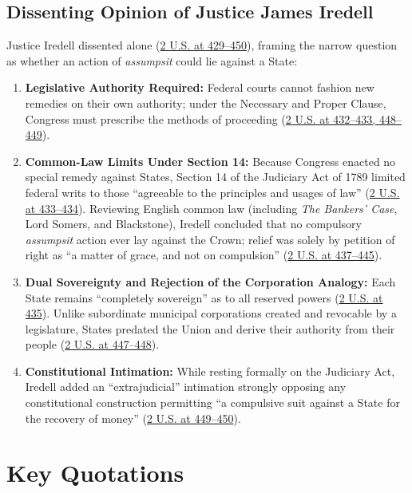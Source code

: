 \documentclass[12pt]{article}
\begin{document}
\subsection{Dissenting Opinion of Justice James Iredell}
Justice Iredell dissented alone (\href{https://supreme.justia.com/cases/federal/us/2/419/}{2 U.S. at 429--450}), framing the narrow question as whether an action of \emph{assumpsit} could lie against a State:
\begin{enumerate}
  \item \textbf{Legislative Authority Required:} Federal courts cannot fashion new remedies on their own authority; under the Necessary and Proper Clause, Congress must prescribe the methods of proceeding (\href{https://supreme.justia.com/cases/federal/us/2/419/}{2 U.S. at 432--433, 448--449}).
  \item \textbf{Common-Law Limits Under Section 14:} Because Congress enacted no special remedy against States, Section 14 of the Judiciary Act of 1789 limited federal writs to those ``agreeable to the principles and usages of law'' (\href{https://supreme.justia.com/cases/federal/us/2/419/}{2 U.S. at 433--434}). Reviewing English common law (including \emph{The Bankers' Case}, Lord Somers, and Blackstone), Iredell concluded that no compulsory \emph{assumpsit} action ever lay against the Crown; relief was solely by petition of right as ``a matter of grace, and not on compulsion'' (\href{https://supreme.justia.com/cases/federal/us/2/419/}{2 U.S. at 437--445}).
  \item \textbf{Dual Sovereignty and Rejection of the Corporation Analogy:} Each State remains ``completely sovereign'' as to all reserved powers (\href{https://supreme.justia.com/cases/federal/us/2/419/}{2 U.S. at 435}). Unlike subordinate municipal corporations created and revocable by a legislature, States predated the Union and derive their authority from their people (\href{https://supreme.justia.com/cases/federal/us/2/419/}{2 U.S. at 447--448}).
  \item \textbf{Constitutional Intimation:} While resting formally on the Judiciary Act, Iredell added an ``extrajudicial'' intimation strongly opposing any constitutional construction permitting ``a compulsive suit against a State for the recovery of money'' (\href{https://supreme.justia.com/cases/federal/us/2/419/}{2 U.S. at 449--450}).
\end{enumerate}

\section{Key Quotations}
\end{document}
